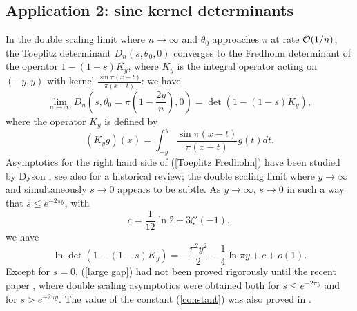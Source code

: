 \documentclass[11pt,fleqn]{article}
\numberwithin{equation}{section}
\def\bigO{{\cal O}}
\begin{document}
\subsection*{Application 2: sine kernel determinants}\label{section: Fredholm}
In the double scaling limit where $n\to\infty$ and $\theta_0$ approaches $\pi$ at rate $\bigO(1/n)$, the Toeplitz determinant $D_n(s,\theta_0,0)$ converges to the Fredholm determinant of the operator $1-(1-s)K_y$, where $K_y$ is the integral operator acting on $(-y,y)$ with kernel $\frac{\sin\pi(x-t)}{\pi(x-t)}$: we have \cite[formulas (236)-(241)]{DIK-hist}
\begin{equation}\label{Toeplitz Fredholm}
\lim_{n\to\infty}D_n(s,\theta_0=\pi (1-\frac{2y}{n}),0)=\det(1-(1-s)K_y),
\end{equation}
where the operator $K_y$ is defined by
\begin{equation}
(K_{y} g)(x)=\int_{-y}^{y}\frac{\sin \pi(x-t)}{\pi(x-t)}g(t)dt.
\end{equation}
Asymptotics for the right hand side of (\ref{Toeplitz Fredholm}) have been studied by Dyson \cite{Dyson}, see also \cite{DIK-hist} for a historical review; the double scaling limit where $y\to\infty$ and simultaneously $s\to 0$ appears to be subtle.
As $y\to\infty$, $s\to 0$ in such a way that $s\leq e^{-2\pi y}$, with
\begin{equation}\label{constant}
c=\frac{1}{12}\ln 2+3\zeta'(-1),
\end{equation} 
we have
\begin{equation}\label{large gap}
\ln \det(1-(1-s)K_y)=-\frac{\pi^{2}y^2}{2}-\frac{1}{4}\ln \pi y+c+o(1).
\end{equation}
Except for $s=0$, (\ref{large gap}) had not been proved rigorously until the recent paper \cite{BDIK}, where double scaling asymptotics were obtained both for $s\leq e^{-2\pi y}$ and for $s> e^{-2\pi y}$. The value of the constant (\ref{constant}) was also proved in \cite{BDIK}.
\end{document}
